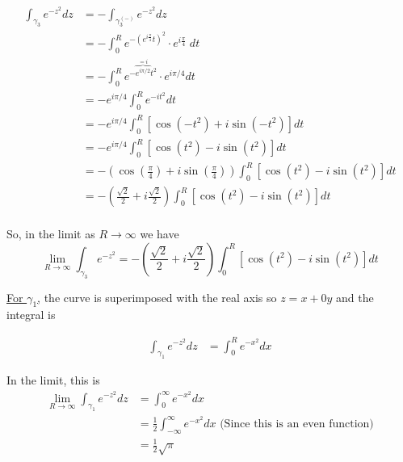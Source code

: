 \documentclass{article}
\begin{document}
\begin{align}
  \int_{{\gamma_3}} e^{-z^2} dz &= - \int_{{\gamma^{(-)}_3}} e^{-z^2} dz \\
  &= -\int_0^{R} e^{-\left(e^{i\frac{\pi}{4}} t\right)^2} \cdot e^{i\frac{\pi}{4}} \; dt \\
  &= -\int_{0}^{R} e^{-\overbrace{e^{i\pi/2}}^{=i} t^2} \cdot e^{i\pi/4} dt \\
  &= -e^{i \pi/4} \int_{0}^{R} e^{-it^2} dt \\
  &= -e^{i\pi / 4} \int_{0}^{R} \left[\cos(-t^2) + i\sin(-t^2)\right] dt \\
  &= -e^{i\pi / 4} \int_{0}^{R} \left[\cos(t^2) - i\sin(t^2)\right] dt \\ 
  &= - \left( \cos\left(\frac{\pi}{4}\right) + i\sin\left(\frac{\pi}{4}\right) \right)\int_{0}^{R} \left[\cos(t^2) - i\sin(t^2)\right] dt \\ 
  &= - \left( \frac{\sqrt{2}}{2} + i \frac{\sqrt{2}}{2} \right)\int_{0}^{R} \left[\cos(t^2) - i\sin(t^2)\right] dt \\ 
\end{align}

So, in the limit as $R \rightarrow \infty$ we have 
\[ \lim_{R \rightarrow \infty} \int_{{\gamma_3}} e^{-z^2} = - \left( \frac{\sqrt{2}}{2} + i \frac{\sqrt{2}}{2} \right)\int_{0}^{R} \left[\cos(t^2) - i\sin(t^2)\right] dt \]

\vskip 0.5cm
\underline{For $\gamma_1$,} the curve is superimposed with the real axis so $z = x + 0y$ and the integral is 

\begin{align*}
  \int_{{\gamma_1}} e^{-z^2} dz &= \int_{0}^R e^{-x^2} dx
\end{align*}

In the limit, this is 
\begin{align*}
  \lim_{R \rightarrow \infty} \int_{{\gamma_1}} e^{-z^2} dz &= \int_{0}^{\infty} e^{-x^2} dx \\
  &= \frac{1}{2} \int_{-\infty}^{\infty} e^{-x^2} dx \text{   (Since this is an even function)} \\
  &= \frac{1}{2} \sqrt{\pi}
\end{align*}
\end{document}

